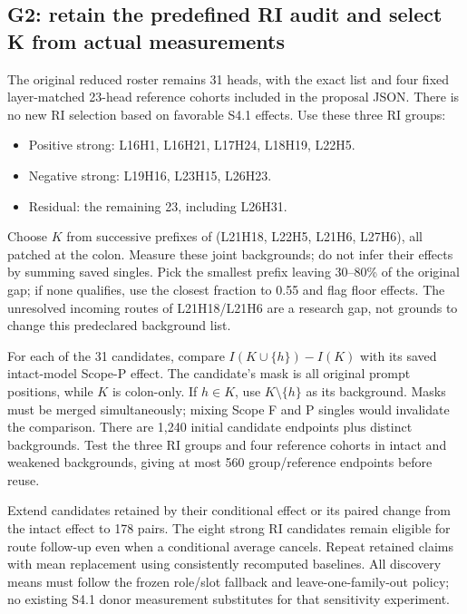 \documentclass[11pt,a4paper]{article}
\begin{document}
\subsection{G2: retain the predefined RI audit and select K from actual measurements}
The original reduced roster remains 31 heads, with the exact list and four fixed layer-matched 23-head reference cohorts included in the proposal JSON. There is no new RI selection based on favorable S4.1 effects. Use these three RI groups:
\begin{itemize}
\item Positive strong: L16H1, L16H21, L17H24, L18H19, L22H5.
\item Negative strong: L19H16, L23H15, L26H23.
\item Residual: the remaining 23, including L26H31.
\end{itemize}

Choose $K$ from successive prefixes of (L21H18, L22H5, L21H6, L27H6), all patched at the colon. Measure these joint backgrounds; do not infer their effects by summing saved singles. Pick the smallest prefix leaving 30--80\% of the original gap; if none qualifies, use the closest fraction to 0.55 and flag floor effects. The unresolved incoming routes of L21H18/L21H6 are a research gap, not grounds to change this predeclared background list.

For each of the 31 candidates, compare $I(K\cup\{h\})-I(K)$ with its saved intact-model Scope-P effect. The candidate's mask is all original prompt positions, while $K$ is colon-only. If $h\in K$, use $K\setminus\{h\}$ as its background. Masks must be merged simultaneously; mixing Scope F and P singles would invalidate the comparison. There are 1,240 initial candidate endpoints plus distinct backgrounds. Test the three RI groups and four reference cohorts in intact and weakened backgrounds, giving at most 560 group/reference endpoints before reuse.

Extend candidates retained by their conditional effect or its paired change from the intact effect to 178 pairs. The eight strong RI candidates remain eligible for route follow-up even when a conditional average cancels. Repeat retained claims with mean replacement using consistently recomputed baselines. All discovery means must follow the frozen role/slot fallback and leave-one-family-out policy; no existing S4.1 donor measurement substitutes for that sensitivity experiment.
\end{document}
